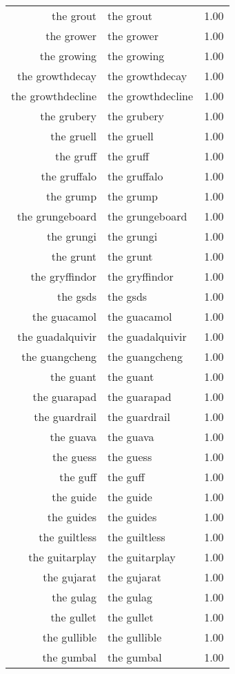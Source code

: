 \begin{table}[ht]
\begin{tabular}{rlr}
  the grout & the grout & 1.00 \\ 
  the grower & the grower & 1.00 \\ 
  the growing & the growing & 1.00 \\ 
  the growthdecay & the growthdecay & 1.00 \\ 
  the growthdecline & the growthdecline & 1.00 \\ 
  the grubery & the grubery & 1.00 \\ 
  the gruell & the gruell & 1.00 \\ 
  the gruff & the gruff & 1.00 \\ 
  the gruffalo & the gruffalo & 1.00 \\ 
  the grump & the grump & 1.00 \\ 
  the grungeboard & the grungeboard & 1.00 \\ 
  the grungi & the grungi & 1.00 \\ 
  the grunt & the grunt & 1.00 \\ 
  the gryffindor & the gryffindor & 1.00 \\ 
  the gsds & the gsds & 1.00 \\ 
  the guacamol & the guacamol & 1.00 \\ 
  the guadalquivir & the guadalquivir & 1.00 \\ 
  the guangcheng & the guangcheng & 1.00 \\ 
  the guant & the guant & 1.00 \\ 
  the guarapad & the guarapad & 1.00 \\ 
  the guardrail & the guardrail & 1.00 \\ 
  the guava & the guava & 1.00 \\ 
  the guess & the guess & 1.00 \\ 
  the guff & the guff & 1.00 \\ 
  the guide & the guide & 1.00 \\ 
  the guides & the guides & 1.00 \\ 
  the guiltless & the guiltless & 1.00 \\ 
  the guitarplay & the guitarplay & 1.00 \\ 
  the gujarat & the gujarat & 1.00 \\ 
  the gulag & the gulag & 1.00 \\ 
  the gullet & the gullet & 1.00 \\ 
  the gullible & the gullible & 1.00 \\ 
  the gumbal & the gumbal & 1.00 \\ 

\end{tabular}
\end{table}

